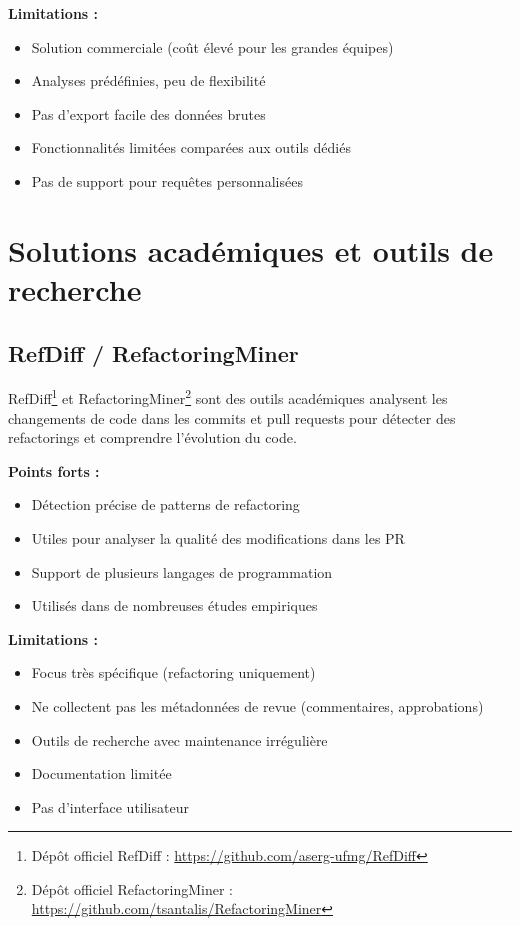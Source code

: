 \textbf{Limitations :}
\begin{itemize}
    \item Solution commerciale (coût élevé pour les grandes équipes)
    \item Analyses prédéfinies, peu de flexibilité
    \item Pas d'export facile des données brutes
    \item Fonctionnalités limitées comparées aux outils dédiés
    \item Pas de support pour requêtes personnalisées
\end{itemize}

\section{Solutions académiques et outils de recherche}

\subsection{RefDiff / RefactoringMiner } 

RefDiff\footnote{Dépôt officiel RefDiff : \url{https://github.com/aserg-ufmg/RefDiff}}  et RefactoringMiner\footnote{Dépôt officiel RefactoringMiner : \url{https://github.com/tsantalis/RefactoringMiner}} sont des outils académiques analysent les changements de code dans les commits et pull requests pour détecter des refactorings et comprendre l'évolution du code.

\textbf{Points forts :}
\begin{itemize}
    \item Détection précise de patterns de refactoring
    \item Utiles pour analyser la qualité des modifications dans les PR
    \item Support de plusieurs langages de programmation
    \item Utilisés dans de nombreuses études empiriques
\end{itemize}

\textbf{Limitations :}
\begin{itemize}
    \item Focus très spécifique (refactoring uniquement)
    \item Ne collectent pas les métadonnées de revue (commentaires, approbations)
    \item Outils de recherche avec maintenance irrégulière
    \item Documentation limitée
    \item Pas d'interface utilisateur
\end{itemize}

